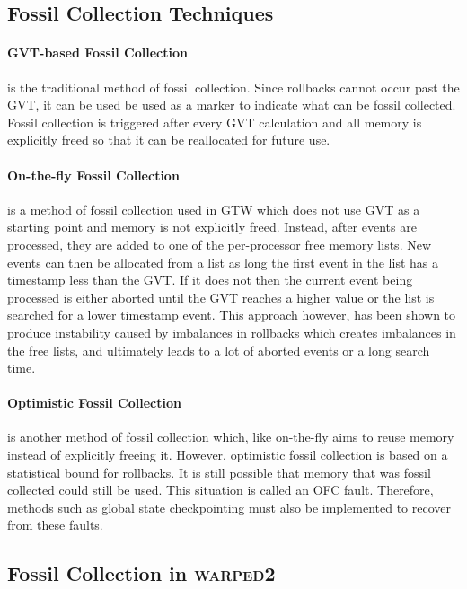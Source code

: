 \documentclass[11pt]{book}
\begin{document}
\subsection{Fossil Collection Techniques}

\paragraph{GVT-based Fossil Collection} is the traditional method of fossil collection.
Since rollbacks cannot occur past the GVT, it can be used be used as a marker to indicate
what can be fossil collected. Fossil collection is triggered after every GVT calculation
and all memory is explicitly freed so that it can be reallocated for future use.

\paragraph{On-the-fly Fossil Collection} is a method of fossil collection used in GTW
which does not use GVT as a starting point and memory is not explicitly freed. Instead, after
events are processed, they are added to one of the per-processor free memory lists. New events
can then be allocated from a list as long the first event in the list has a timestamp less than
the GVT. If it does not then the current event being processed is either aborted until the GVT
reaches a higher value or the list is searched for a lower timestamp event. This approach however,
has been shown to produce instability caused by imbalances in rollbacks which creates imbalances
in the free lists, and ultimately leads to a lot of aborted events or a long search time.

\paragraph{Optimistic Fossil Collection} is another method of fossil collection which, like
on-the-fly aims to reuse memory instead of explicitly freeing it. However, optimistic fossil
collection is based on a statistical bound for rollbacks. It is still possible that memory that
was fossil collected could still be used. This situation is called an OFC fault. Therefore,
methods such as global state checkpointing must also be implemented to recover from these faults.

\subsection{Fossil Collection in \textsc{warped2}}
\end{document}
